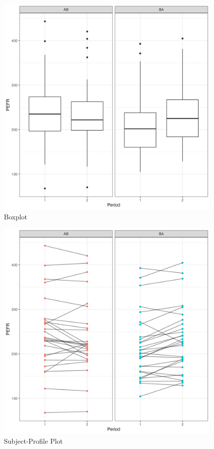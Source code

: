 \documentclass[12pt, TexShade, letterpaper]{report}
\begin{document}
\begin{figure}[ht]
    \centering
    \includegraphics[width=0.85\linewidth]{report/figures/ch2/boxplot.png}
    \caption{Boxplot}
    \label{fig:boxplot}
\end{figure}
\begin{figure}[ht]
    \centering
    \includegraphics[width=0.85\linewidth]{report/figures/ch2/subjectProfilesPlot.png}
    \caption{Subject-Profile Plot}
    \label{fig:subjectprofile}
\end{figure}
\end{document}

